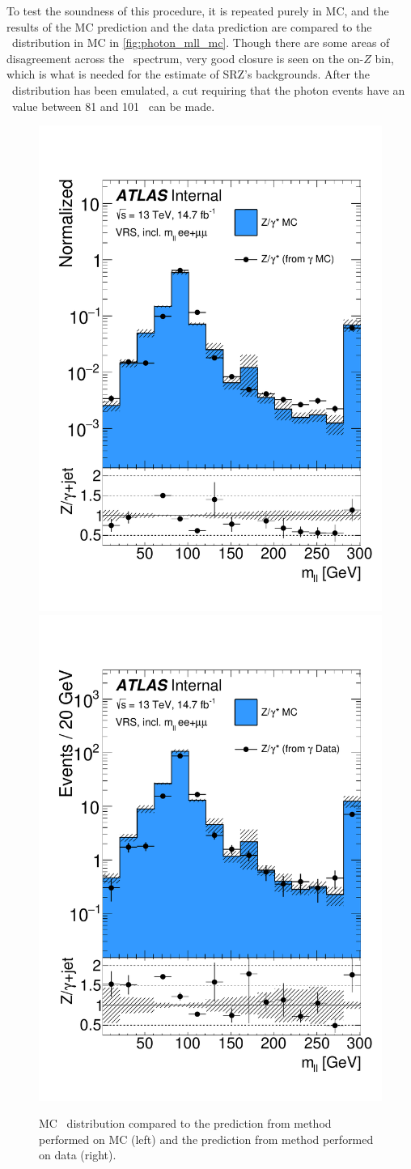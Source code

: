 To test the soundness of this procedure, it is repeated purely in \ac{MC}, and the results of the \ac{MC} prediction and the data prediction are compared to the \mll~distribution in \dyjets \ac{MC} in \autoref{fig:photon_mll_mc}. Though there are some areas of disagreement across the \mll~spectrum, very good closure is seen on the on-$Z$ bin, which is what is needed for the estimate of SRZ's backgrounds. After the \mll~distribution has been emulated, a cut requiring that the photon events have an \mll~value between 81 and 101 \gev~can be made.

\begin{centering}
\begin{figure}[!hbt]
\myfloatalign
\includegraphics[width=.45\linewidth]{figures/photons/DataMC_GJ_ee+mm_zmet_GMC.pdf}
\includegraphics[width=.45\linewidth]{figures/photons/DataMC_GJ_ee+mm_zmet_ZMC.pdf}
\caption{\dyjets \ac{MC} \mll~distribution compared to the prediction from \gjets method performed on \ac{MC} (left) and the prediction from \gjets method performed on data (right).}
\label{fig:photon_mll_mc}
\end{figure}
\end{centering}

